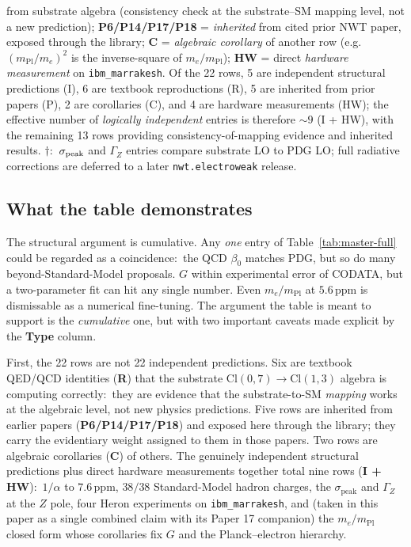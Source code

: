 \documentclass[11pt]{article}
\newcommand{\mPl}{m_{\mathrm{Pl}}}
\newcommand{\me}{m_e}
\begin{document}
\begin{table}[!p]
{from substrate algebra (consistency check at the substrate--SM
mapping level, not a new prediction);
\textbf{P6/P14/P17/P18} = \emph{inherited} from cited prior
NWT paper, exposed through the library; \textbf{C} =
\emph{algebraic corollary} of another row (e.g.\
$(\mPl/\me)^2$ is the inverse-square of $\me/\mPl$);
\textbf{HW} = direct \emph{hardware measurement} on
\texttt{ibm\_marrakesh}.  Of the 22 rows, 5 are independent
structural predictions (I), 6 are textbook reproductions (R),
5 are inherited from prior papers (P), 2 are corollaries (C),
and 4 are hardware measurements (HW); the effective number of
\emph{logically independent} entries is therefore
$\sim 9$ (I + HW), with the remaining 13 rows providing
consistency-of-mapping evidence and inherited results.
$\dag$:\ $\sigma_{\rm peak}$ and $\Gamma_Z$ entries compare
substrate LO to PDG LO; full radiative corrections are deferred
to a later \texttt{nwt.electroweak} release.}
\label{tab:master-full}
\end{table}

\subsection{What the table demonstrates}

The structural argument is cumulative.  Any \emph{one} entry of
Table~\ref{tab:master-full} could be regarded as a coincidence:\
the QCD $\beta_0$ matches PDG, but so do many beyond-Standard-Model
proposals.  $G$ within experimental error of CODATA, but a
two-parameter fit can hit any single number.  Even
$\me / \mPl$ at $5.6$\,ppm is dismissable as a numerical
fine-tuning.  The argument the table is meant to support is the
\emph{cumulative} one, but with two important caveats made
explicit by the \textbf{Type} column.

First, the 22 rows are not 22 independent predictions.  Six are
textbook QED/QCD identities (\textbf{R}) that the substrate
$\mathrm{Cl}(0,7)\!\to\!\mathrm{Cl}(1,3)$ algebra is computing
correctly:\ they are evidence that the substrate-to-SM
\emph{mapping} works at the algebraic level, not new physics
predictions.  Five rows are inherited from earlier papers
(\textbf{P6/P14/P17/P18}) and exposed here through the library;
they carry the evidentiary weight assigned to them in those
papers.  Two rows are algebraic corollaries (\textbf{C}) of
others.  The genuinely independent structural predictions plus
direct hardware measurements together total nine rows
(\textbf{I + HW}):\ $1/\alpha$ to $7.6$\,ppm, $38/38$ Standard-Model
hadron charges, the $\sigma_{\mathrm{peak}}$ and $\Gamma_Z$ at the
$Z$ pole, four Heron experiments on \texttt{ibm\_marrakesh}, and
(taken in this paper as a single combined claim with its Paper 17
companion) the $\me/\mPl$ closed form whose corollaries fix $G$
and the Planck--electron hierarchy.
\end{document}
